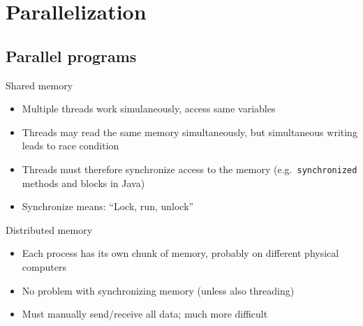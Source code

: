 \documentclass[usenames,dvipsnames,mathserif,compress]{beamer}
\begin{document}

\section*{Parallelization}
\subsection*{Parallel programs}


\begin{frame}
  \begin{block}{Shared memory}
    \begin{itemize}
    \item Multiple threads work simulaneously, access same variables
    \item Threads may read the same memory simultaneously, but
      simultaneous writing leads to \alert{race condition}
    \item Threads must therefore \alert{synchronize} access to the memory
      (e.g.~\texttt{synchronized} methods and blocks in Java)
    \item Synchronize means: ``Lock, run, unlock''
    \end{itemize}
  \end{block}
  \begin{block}{Distributed memory}
    \begin{itemize}
    \item Each process has its own chunk of memory, probably on different physical computers
    \item No problem with synchronizing memory (unless also threading)
    \item Must manually send/receive all data; much more difficult
    \end{itemize}
  \end{block}
\end{frame}
\end{document}
